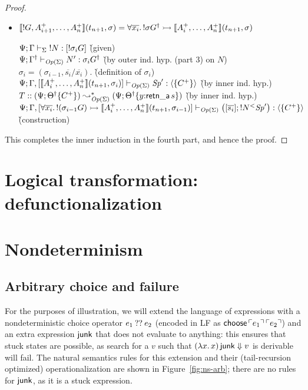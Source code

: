 \begin{proof}
\begin{itemize}
\item $\llbracket {{!}G,A^+_{i+1},\ldots,A^+_n} \rrbracket({t_{n+1}},{\sigma}) = \forall
  \overline{x_i}.\, {!}\sigma{{G}^\dag} \rightarrowtail
  \llbracket {A^+_i,\ldots,A^+_n} \rrbracket({t_{n+1}},{\sigma})$

  \begin{tabbing}
  ${\Psi}; {\Gamma} \vdash_{\Sigma} {{!}{N}} : {[{!}\sigma_i{G}]}$
  \` (given) 
  \\
  ${\Psi}; {{{\Gamma}^\dag}} \vdash_{{\it Op}({\Sigma})} {N'} : {\sigma_i{{{G}^\dag}}}$
  \` (by outer ind. hyp. (part 3)  on $N$) 
  \\
  $\sigma_i = (\sigma_{i-1}, \overline{s_i}/\overline{x_i})$.
  \` (definition of $\sigma_i$)
  \\
  ${\Psi}; {\Gamma, [\llbracket {A^+_i,\ldots,A^+_n} \rrbracket({t_{n+1}},{\sigma_{i}})]} \vdash_{{\it Op}({\Sigma})} {{\it Sp}'} : {\langle {\{ C^+ \} } \rangle}$
  \` (by inner ind. hyp.)
  \\
  $T :: (\Psi; {{{\Theta}^\dag}}\{{C^+}\}) \leadsto^*_{{\it Op}({\Sigma})}
   (\Psi; {{{\Theta}^\dag}}\{{y{:}{\sf retn\_a}\,s}\})$
  \` (by inner ind. hyp.)
  \\
  ${\Psi}; {\Gamma, [\forall \overline{x_i}.\, {!}(\sigma_{i-1}{G})
                \rightarrowtail \llbracket {A^+_i,\ldots,A^+_n} \rrbracket({t_{n+1}},{\sigma_{i-1}})]} \vdash_{{\it Op}({\Sigma})} {\left([{\overline{s_i}}]; {{{!}{N}}{^{<}}{{\it Sp}'}}\right)} : {\langle {\{ C^+ \}} \rangle}$
  \\ 
  \` (construction)
  \end{tabbing}
\end{itemize}

\noindent
This completes the inner induction in the fourth part, and hence
the proof.
\end{proof}

\section{Logical transformation: defunctionalization}
\label{sec:defunctionalization}

\section{Nondeterminism}

\subsection{Arbitrary choice and failure}

For the purposes of illustration, we will extend the language of
expressions with a nondeterministic choice operator $e_1 \mathbin{??} e_2$
(encoded in LF as ${\sf choose}\,{\ulcorner{e_1}\urcorner}\,{\ulcorner{e_2}\urcorner}$) and an
extra expression ${\sf junk}$ that does not evaluate to anything: this
ensures that stuck states are possible, as search for a $v$ such that
$(\lambda x.\,x)\,{\sf junk} \Downarrow v$ is derivable will fail.
The natural semantics rules for this extension and their
(tail-recursion optimized) operationalization are shown in
Figure~\ref{fig:ns-arb}; there are no rules for ${\sf junk}$, as it is
a stuck expression.

